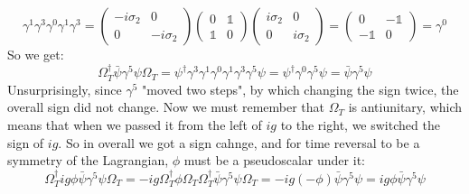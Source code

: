 \documentclass{article}
\begin{document}
\begin{equation}
    \gamma^1\gamma^3\gamma^0\gamma^1\gamma^3 =
    \begin{pmatrix}
        -i\sigma_2 & 0 \\ 0 & -i\sigma_2
    \end{pmatrix}
    \begin{pmatrix}
        0 & \mathbb{1} \\ \mathbb{1} & 0
    \end{pmatrix}
    \begin{pmatrix}
        i\sigma_2 & 0 \\ 0 & i\sigma_2
    \end{pmatrix} =
    \begin{pmatrix}
        0 & -\mathbb{1} \\ -\mathbb{1} & 0
    \end{pmatrix} = \gamma^0
\end{equation}
So we get:
\begin{equation}
    \Omega_T^\dagger \bar{\psi}\gamma^5\psi \Omega_T = 
    \psi^\dagger\gamma^3\gamma^1\gamma^0\gamma^1\gamma^3\gamma^5 \psi =
    \psi^\dagger\gamma^0\gamma^5 \psi = \bar{\psi} \gamma^5 \psi
\end{equation}
Unsurprisingly, since $\gamma^5$ "moved two steps", by which changing the sign twice, the overall sign did not change. Now we must remember that $\Omega_T$ is antiunitary, which means that when we passed it from the left of $ig$ to the right, we switched the sign of $ig$. So in overall we got a sign cahnge, and for time reversal to be a symmetry of the Lagrangian, $\phi$ must be a pseudoscalar under it:
\begin{equation}
    \Omega_T^\dagger ig \phi \bar{\psi}\gamma^5\psi \Omega_T =
    -ig \Omega_T^\dagger  \phi  \Omega_T \Omega_T^\dagger  \bar{\psi}\gamma^5\psi \Omega_T = -ig \left(-\phi\right) \bar{\psi}\gamma^5\psi = ig\phi \bar{\psi}\gamma^5\psi
\end{equation}
\end{document}
